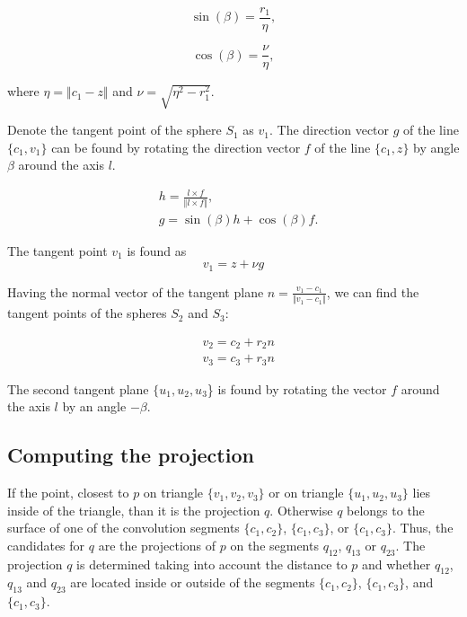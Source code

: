 \documentclass[10pt,journal,a4paper]{IEEEtran}
\begin{document}
\begin{equation}
	\sin(\beta) = \frac{r_1}{\eta},
\end{equation}

\begin{equation}
	\cos(\beta) = \frac{\nu}{\eta},
\end{equation}

where $\eta = \Vert c_1 - z \Vert $ and $\nu = \sqrt{\eta^2 -  r_1^2}$. 

Denote the tangent point of the sphere $S_1$ as $v_1$. The direction vector $g$ of the line $\{c_1, v_1\}$ can be found by rotating the direction vector $f$ of the line 
$\{c_1, z\}$ by angle $\beta$ around the axis $l$.

\begin{align}
	& h = \frac{l \times f}{\Vert l \times f \Vert}, \\
	& g = \sin(\beta) h + \cos(\beta) f.	
\end{align}

The tangent point $v_1$ is found as
\begin{equation}
v_1 = z + \nu  g
\end{equation}


Having the normal vector of the tangent plane $n = \frac{v_1 - c_1}{\Vert v_1 - c_1 \Vert}$, we can find the tangent points of the spheres $S_2$ and $S_3$:

\begin{align}
	& v_2 = c_2  + r_2 n \\
	& v_3 = c_3 + r_3 n 
\end{align}

The second tangent plane $\{u_1, u_2, u_3$\} is found by rotating the vector $f$ around the axis $l$ by an angle $-\beta$.



\subsection{Computing the projection}

If the point, closest to $p$ on triangle $\{v_1, v_2, v_3\}$ or on triangle $\{u_1, u_2, u_3\}$ lies inside of the triangle, than it is the projection $q$. Otherwise $q$ belongs to the surface of one of the convolution segments $\{c_1, c_2\}$,  $\{c_1, c_3\}$, or  $\{c_1, c_3\}$. Thus, the candidates for $q$ are the projections of $p$ on the segments $q_{12}$, $q_{13}$ or $q_{23}$. The projection $q$ is determined taking into account the distance to $p$ and whether  $q_{12}$, $q_{13}$ and $q_{23}$ are located inside or outside of the segments $\{c_1, c_2\}$,  $\{c_1, c_3\}$, and  $\{c_1, c_3\}$.  
\end{document}
